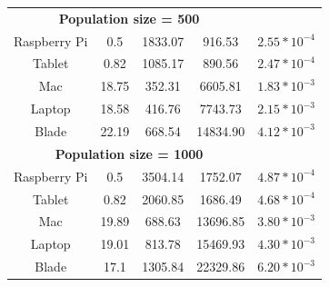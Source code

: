 \begin{small}
\begin{table}[!ht]
\begin{tabular}{ccccc}
\multicolumn{4}{c}{\textbf{Population size = 500}}\\ %
Raspberry Pi & 0.5 & 1833.07 & 916.53 & $2.55*10^{-4}$ \\
Tablet & 0.82 & 1085.17 & 890.56 & $2.47*10^{-4}$ \\
Mac & 18.75 & 352.31 & 6605.81 & $1.83*10^{-3}$ \\
Laptop & 18.58 & 416.76 & 7743.73 & $2.15*10^{-3}$ \\
Blade & 22.19 & 668.54 & 14834.90 & $4.12*10^{-3}$ \\ \hline
\multicolumn{4}{c}{\textbf{Population size = 1000}}\\ %
Raspberry Pi & 0.5 & 3504.14 & 1752.07 & $4.87*10^{-4}$ \\
Tablet & 0.82 & 2060.85 & 1686.49 & $4.68*10^{-4}$ \\
Mac & 19.89 & 688.63 & 13696.85 & $3.80*10^{-3}$ \\
Laptop & 19.01 & 813.78 & 15469.93 & $4.30*10^{-3}$ \\
Blade &	17.1 & 1305.84 & 22329.86 & $6.20*10^{-3}$ \\ \hline

\end{tabular}
\end{table} 
\end{small}



